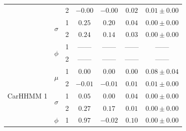\begin{table}[]
{\begin{tabular}{ccccccc}
                           &                               & 2                             & $-0.00$                         & $-0.00$                     & $0.02$                             & $0.01 \pm 0.00$                             \\
                           & \multirow{2}{*}{$\sigma$}     & 1                             & $0.25$                         & $0.20$                     & $0.04$                             & $0.00 \pm 0.00$                             \\
                           &                               & 2                             & $0.24$                         & $0.14$                     & $0.03$                             & $0.00 \pm 0.00$                             \\ 
                           & \multirow{2}{*}{$\phi$}       & 1                             & ------                         & ------                     & ------                             & ------                                      \\
                           &                               & 2                             & ------                         & ------                     & ------                             & ------                                      \\ \hline
\multirow{6}{*}{CarHHMM 1} & \multirow{2}{*}{$\mu$}        & 1                             & $0.00$                         & $0.00$                     & $0.00$                             & $0.08 \pm 0.04$                             \\
                           &                               & 2                             & $-0.01$                         & $-0.01$                     & $0.01$                             & $0.01 \pm 0.00$                             \\
                           & \multirow{2}{*}{$\sigma$}     & 1                             & $0.05$                         & $0.00$                     & $0.04$                             & $0.00 \pm 0.00$                             \\
                           &                               & 2                             & $0.27$                         & $0.17$                     & $0.01$                             & $0.00 \pm 0.00$                             \\ 
                           & \multirow{2}{*}{$\phi$}       & 1                             & $0.97$                         & $-0.02$                     & $0.10$                             & $0.00 \pm 0.00$                             \\

\end{tabular}}
\end{table}
